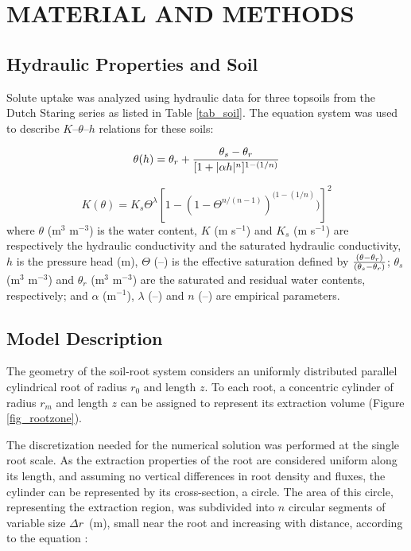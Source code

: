 \def\clim{$C_{lim}$}
\def\c2{$C_2$}
\def\uwc{(m$^3$ m$^{-3}$) }


\section*{MATERIAL AND METHODS}

\subsection*{Hydraulic Properties and Soil}

Solute uptake was analyzed using hydraulic data for three topsoils from the Dutch Staring series \citep{wosten} as listed in Table \ref{tab_soil}.
The \cite{genuchten80} equation system was used to describe $K$--$\theta$--$h$ relations for these soils:

\label{eq_theta}
\begin{equation}
\theta(h) = \theta_r + {\theta_s-\theta_r \over [1+|\alpha h|^n]^{1-(1/n)}}
\end{equation}

\label{eq_K}
\begin{equation}
K(\theta) = K_{s} \Theta^\lambda [1-(1-\Theta^{n/(n-1)})^{(1-(1/n)})]^2 
\end{equation}
%
where $\theta$ \uwc is the water content, $K$ (m s$^{-1}$) and $K_s$ (m s$^{-1}$) are respectively the hydraulic conductivity and the saturated hydraulic conductivity, $h$ is the pressure head (m), $\Theta$ (--) is the effective saturation defined by ${(\theta - \theta_r) \over (\theta_s-\theta_r)}$; $\theta_s$ \uwc and $\theta_r$ \uwc are the saturated and residual water contents, respectively; and $\alpha$ (m$^{-1}$), $\lambda$ (--) and $n$ (--) are empirical parameters.





\subsection*{Model Description}

The geometry of the soil-root system considers an uniformly distributed parallel cylindrical root of radius $r_0$ and length $z$. 
To each root, a concentric cylinder of radius $r_m$ and length $z$ can be assigned to represent its extraction volume (Figure \ref{fig_rootzone}).

The discretization needed for the numerical solution was performed at the single root scale. 
As the extraction properties of the root are considered uniform along its length, and assuming no vertical differences in root density and fluxes, the cylinder can be represented by its cross-section, a circle. 
The area of this circle, representing the extraction region, was subdivided into $n$ circular segments of variable size $\Delta r$~(m), small near the root and increasing with distance, according to the equation \cite{liersolute}:


